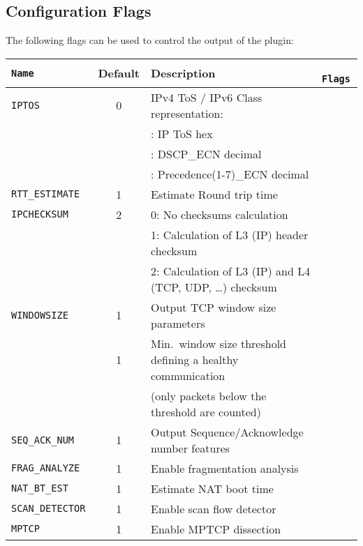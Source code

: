 \documentclass[documentation]{subfiles}
\begin{document}
\subsection{Configuration Flags}
The following flags can be used to control the output of the plugin:
\begin{longtable}{>{\tt}lcl>{\tt\small}l}
    \toprule
    {\bf Name} & {\bf Default} & {\bf Description} & {\bf Flags}\\
    \midrule\endhead%
    IPTOS             & 0  & IPv4 ToS / IPv6 Class representation:                        & \\
                      &    & \qquad 0: IP ToS hex                                         & \\
                      &    & \qquad 1: DSCP\_ECN decimal                                  & \\
                      &    & \qquad 2: Precedence(1-7)\_ECN decimal                       & \\
    RTT\_ESTIMATE     & 1  & Estimate Round trip time                                     & \\
    IPCHECKSUM        & 2  & 0: No checksums calculation                                  & \\
                      &    & 1: Calculation of L3 (IP) header checksum                    & \\
                      &    & 2: Calculation of L3 (IP) and L4 (TCP, UDP, \ldots) checksum & \\
    WINDOWSIZE        & 1  & Output TCP window size parameters                            & \\
    \nameref{WINMIN}  & 1  & Min.\ window size threshold defining a healthy communication & \\
                      &    & (only packets below the threshold are counted)               & \\
    SEQ\_ACK\_NUM     & 1  & Output Sequence/Acknowledge number features                  & \\
    FRAG\_ANALYZE     & 1  & Enable fragmentation analysis                                & \\
    NAT\_BT\_EST      & 1  & Estimate NAT boot time                                       & \\
    SCAN\_DETECTOR    & 1  & Enable scan flow detector                                    & \\
    MPTCP             & 1  & Enable MPTCP dissection                                      & \\

\end{longtable}
\end{document}
